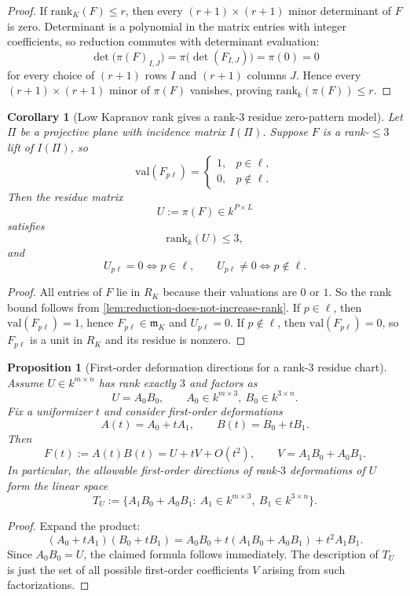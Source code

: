 \documentclass[11pt]{amsart}
\numberwithin{equation}{section}
\theoremstyle{plain}
\newtheorem{proposition}[theorem]{Proposition}
\newtheorem{corollary}[theorem]{Corollary}
\theoremstyle{definition}
\theoremstyle{remark}
\newcommand{\rank}{\mathrm{rank}}
\newcommand{\val}{\mathrm{val}}
\begin{document}
\begin{proof}
If $\rank_K(F)\le r$, then every $(r+1)\times(r+1)$ minor determinant of $F$ is zero.
Determinant is a polynomial in the matrix entries with integer coefficients, so reduction commutes with determinant evaluation:
\[
\det\bigl(\pi(F)_{I,J}\bigr)=\pi\bigl(\det(F_{I,J})\bigr)=\pi(0)=0
\]
for every choice of $(r+1)$ rows $I$ and $(r+1)$ columns $J$.
Hence every $(r+1)\times(r+1)$ minor of $\pi(F)$ vanishes, proving $\rank_k(\pi(F))\le r$.
\end{proof}

\begin{corollary}[Low Kapranov rank gives a rank-$3$ residue zero-pattern model]
\label{cor:kapr3-residue-zero-pattern}
Let $\Pi$ be a projective plane with incidence matrix $I(\Pi)$.
Suppose $F$ is a rank-$\le 3$ lift of $I(\Pi)$, so
\[
\val(F_{p\ell})=
\begin{cases}
1,& p\in \ell,\\
0,& p\notin \ell.
\end{cases}
\]
Then the residue matrix
\[
U:=\pi(F)\in k^{P\times L}
\]
satisfies
\[
\rank_k(U)\le 3,
\]
and
\[
U_{p\ell}=0 \iff p\in \ell,
\qquad
U_{p\ell}\neq 0 \iff p\notin \ell.
\]
\end{corollary}

\begin{proof}
All entries of $F$ lie in $R_K$ because their valuations are $0$ or $1$.
So the rank bound follows from \cref{lem:reduction-does-not-increase-rank}.
If $p\in\ell$, then $\val(F_{p\ell})=1$, hence $F_{p\ell}\in\mathfrak m_K$ and $U_{p\ell}=0$.
If $p\notin\ell$, then $\val(F_{p\ell})=0$, so $F_{p\ell}$ is a unit in $R_K$ and its residue is nonzero.
\end{proof}

\begin{proposition}[First-order deformation directions for a rank-$3$ residue chart]
\label{prop:first-order-tangent-directions}
Assume $U\in k^{m\times n}$ has rank exactly $3$ and factors as
\[
U=A_0B_0,
\qquad
A_0\in k^{m\times 3},\ B_0\in k^{3\times n}.
\]
Fix a uniformizer $t$ and consider first-order deformations
\[
A(t)=A_0+tA_1,
\qquad
B(t)=B_0+tB_1.
\]
Then
\[
F(t):=A(t)B(t)=U+tV+O(t^2),
\qquad
V=A_1B_0+A_0B_1.
\tag{4.4}
\]
In particular, the allowable first-order directions of rank-$3$ deformations of $U$ form the linear space
\[
T_U:=\{A_1B_0+A_0B_1:\ A_1\in k^{m\times 3},\ B_1\in k^{3\times n}\}.
\tag{4.5}
\]
\end{proposition}

\begin{proof}
Expand the product:
\[
(A_0+tA_1)(B_0+tB_1)=A_0B_0+t(A_1B_0+A_0B_1)+t^2A_1B_1.
\]
Since $A_0B_0=U$, the claimed formula follows immediately.
The description of $T_U$ is just the set of all possible first-order coefficients $V$ arising from such factorizations.
\end{proof}
\end{document}
